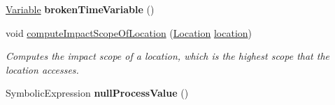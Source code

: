 \begin{DoxyCompactItemize}
\item 
\hypertarget{classedu_1_1udel_1_1cis_1_1vsl_1_1civl_1_1model_1_1common_1_1CommonModelFactory_ad262f17296a18b9e79c98e2fcc3ec5ec}{}\hyperlink{interfaceedu_1_1udel_1_1cis_1_1vsl_1_1civl_1_1model_1_1IF_1_1variable_1_1Variable}{Variable} {\bfseries broken\+Time\+Variable} ()\label{classedu_1_1udel_1_1cis_1_1vsl_1_1civl_1_1model_1_1common_1_1CommonModelFactory_ad262f17296a18b9e79c98e2fcc3ec5ec}

\item 
void \hyperlink{classedu_1_1udel_1_1cis_1_1vsl_1_1civl_1_1model_1_1common_1_1CommonModelFactory_a685c75b96aac70ca772d261a8aec3551}{compute\+Impact\+Scope\+Of\+Location} (\hyperlink{interfaceedu_1_1udel_1_1cis_1_1vsl_1_1civl_1_1model_1_1IF_1_1location_1_1Location}{Location} \hyperlink{classedu_1_1udel_1_1cis_1_1vsl_1_1civl_1_1model_1_1common_1_1CommonModelFactory_ae5db41658dca91cece29587770c1e33f}{location})
\begin{DoxyCompactList}\small\item\em Computes the impact scope of a location, which is the highest scope that the location accesses. \end{DoxyCompactList}\item 
\hypertarget{classedu_1_1udel_1_1cis_1_1vsl_1_1civl_1_1model_1_1common_1_1CommonModelFactory_a7416479bc49151c1b71cb7e1158f3d05}{}Symbolic\+Expression {\bfseries null\+Process\+Value} ()\label{classedu_1_1udel_1_1cis_1_1vsl_1_1civl_1_1model_1_1common_1_1CommonModelFactory_a7416479bc49151c1b71cb7e1158f3d05}


\end{DoxyCompactItemize}
